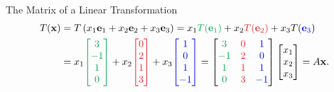 \documentclass[xcolor=dvipsnames,aspectratio=169,t]{beamer}
\begin{document}
\begin{frame}{The Matrix of a Linear Transformation}
  \pause
  \begin{align*}
  T(\mathbf{x}) &= T\left( x_1 \mathbf{e}_1 + x_2 \mathbf{e}_2 + x_3 \mathbf{e}_3 \right) = x_1 \colorg{T(\mathbf{e}_1)} + x_2 \colorr{T(\mathbf{e}_2)}  + x_3 T(\colorb{\mathbf{e}_3})  \\
  &= x_1 \colorg{\begin{bmatrix} 3\\-1\\1\\0\end{bmatrix}} + x_2  \colorr{\begin{bmatrix} 0\\2\\1\\3\end{bmatrix}}  + x_3  \colorb{\begin{bmatrix} 1\\0\\1\\-1\end{bmatrix} } 
  = \begin{bmatrix} \colorg{3} & \colorr{0} & \colorb{1} \\ \colorg{-1} & \colorr{2} & \colorb{0} \\ \colorg{1} & \colorr{1} & \colorb{1} \\ \colorg{0} & \colorr{3} & \colorb{-1} \end{bmatrix} \begin{bmatrix}x_1\\x_2\\x_3 \end{bmatrix} 
  = A \x.
  \end{align*}

\end{frame}
\end{document}
